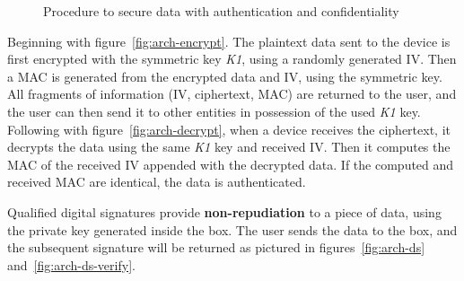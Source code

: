 \begin{figure}[h]
	\centering     %
	\caption{Procedure to secure data with authentication and confidentiality}
\end{figure}

Beginning with figure~\ref{fig:arch-encrypt}. The plaintext data sent to the device is first encrypted with the symmetric key \textit{K1}, using a randomly generated \ac{IV}. Then a \ac{MAC} is generated from the encrypted data and \ac{IV}, using the symmetric key. All fragments of information (IV, ciphertext, MAC) are returned to the user, and the user can then send it to other entities in possession of the used \textit{K1} key.
Following with figure~\ref{fig:arch-decrypt}, when a device receives the ciphertext, it decrypts the data using the same \textit{K1} key and received \ac{IV}. Then it computes the MAC of the received \ac{IV} appended with the decrypted data. If the computed and received \ac{MAC} are identical, the data is authenticated.

Qualified digital signatures provide \textbf{non-repudiation} to a piece of data, using the private key generated inside the box. The user sends the data to the box, and the subsequent signature will be returned as pictured in figures~\ref{fig:arch-ds} and~\ref{fig:arch-ds-verify}.

